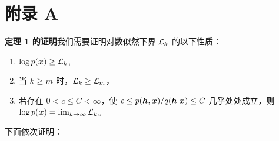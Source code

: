 \clearpage\section*{附录 A}
\label{apx:proofs}


\textbf{定理 1 的证明}\quad 我们需要证明对数似然下界 $\mathcal{L}_{k}$ 的以下性质：
 \begin{enumerate} 
 \item $\log p(\bm{x}) \geq \mathcal{L}_{k}$,
\item 当 $k\geq m$ 时，$\mathcal{L}_{k}\geq\mathcal{L}_{m}$，
\item 若存在 $0<c\leq C<\infty$，使 $c\leq p(\bm{h},\bm{x})/q(\bm{h}|\bm{x})\leq C$ 几乎处处成立，则 $\log p(\bm{x})=\lim_{k\to\infty}\mathcal{L}_{k}$。
 \end{enumerate}
下面依次证明：
